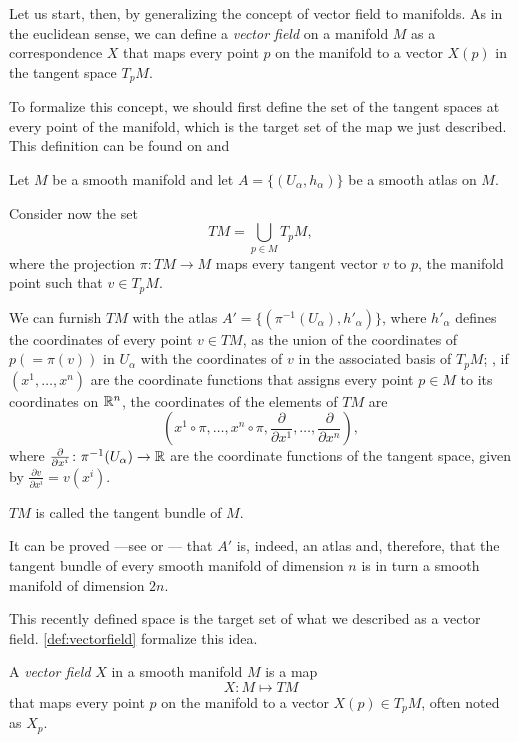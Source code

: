 Let us start, then, by generalizing the concept of vector field to manifolds. As in the euclidean sense, we can define a \emph{vector field} on a manifold $M$ as a correspondence $X$ that maps every point $p$ on the manifold to a vector $X(p)$ in the tangent space $T_p M$.

To formalize this concept, we should first define the set of the tangent spaces at every point of the manifold, which is the target set of the map we just described. This definition can be found on \cite[p. 26]{oneill83} and \cite[p. 13]{docarmo79}

\begin{definition}
	Let $M$ be a smooth manifold and let $A = \{(U_\alpha, h_\alpha)\}$ be a smooth atlas on $M$.
	
	Consider now the set
	\[
		TM = \bigcup_{p \in M} T_p M,
	\]
	where the projection $\pi \colon TM \to M$ maps every tangent vector $v$ to $p$, the manifold point such that $v \in T_p M$.

	We can furnish $TM$ with the atlas $A' = \{(\pi^{-1}(U_\alpha), h'_\alpha)\}$, where $h'_\alpha$ defines the coordinates of every point $v \in TM$, as the union of the coordinates of $p (= \pi(v))$ in $U_\alpha$ with the coordinates of $v$ in the associated basis of $T_p M$; \ie, if $(x^1, \dots, x^n)$ are the coordinate functions that assigns every point $p \in M$ to its coordinates on $\mathbb{R}^n$, the coordinates of the elements of $TM$ are
	\[
		(x^1 \circ \pi, \dots, x^n \circ \pi, \frac{\partial}{\partial {x^1}}, \dots, \frac{\partial}{\partial {x^n}}),
	\]
	where $\frac{\partial}{\partial {x^i}} \colon \pi^{-1}(U_\alpha) \to \mathbb{R}$ are the coordinate functions of the tangent space, given by $\frac{\partial v}{\partial {x^i}} = v(x^i)$.
	
	$TM$ is called the tangent bundle of $M$.
\end{definition}

It can be proved ---see \cite[Example 2.1]{docarmo79} or \cite[pp. 26, 27]{oneill83}--- that $A'$ is, indeed, an atlas and, therefore, that the tangent bundle of every smooth manifold of dimension $n$ is in turn a smooth manifold of dimension $2n$.

This recently defined space is the target set of what we described as a vector field. \autoref{def:vectorfield} formalize this idea.

\begin{definition}
	\label{def:vectorfield}
	A \emph{vector field} $X$ in a smooth manifold $M$ is a map
	\[
		X \colon M \mapsto TM
	\]
	that maps every point $p$ on the manifold to a vector $X(p) \in T_p M$, often noted as $X_p$.
\end{definition}

